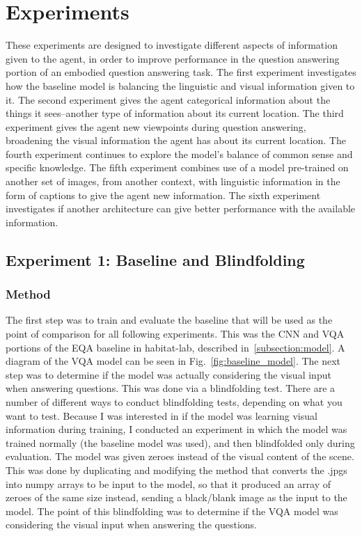 \chapter{Experiments}
These experiments are designed to investigate different aspects of information given to the agent, in order to improve performance in the question answering portion of an embodied question answering task. The first experiment investigates how the baseline model is balancing the linguistic and visual information given to it. The second experiment gives the agent categorical information about the things it sees--another type of information about its current location. The third experiment gives the agent new viewpoints during question answering, broadening the visual information the agent has about its current location. The fourth experiment continues to explore the model's balance of common sense and specific knowledge. The fifth experiment combines use of a model pre-trained on another set of images, from another context, with linguistic information in the form of captions to give the agent new information. The sixth experiment investigates if another architecture can give better performance with the available information. 

\section{Experiment 1: Baseline and Blindfolding}
\label{sec:exp_1}
\subsection{Method}
The first step was to train and evaluate the baseline that will be used as the point of comparison for all following experiments. This was the CNN and VQA portions of the EQA baseline in habitat-lab, described in~\ref{subsection:model}. A diagram of the VQA model can be seen in Fig.~\ref{fig:baseline_model}. \newline
The next step was to determine if the model was actually considering the visual input when answering questions. This was done via a blindfolding test. There are a number of different ways to conduct blindfolding tests, depending on what you want to test. Because I was interested in if the model was learning visual information during training, I conducted an experiment in which the model was trained normally (the baseline model was used), and then blindfolded only during evaluation. The model was given zeroes instead of the visual content of the scene. This was done by duplicating and modifying the method that converts the .jpgs into numpy arrays to be input to the model, so that it produced an array of zeroes of the same size instead, sending a black/blank image as the input to the model. The point of this blindfolding was to determine if the VQA model was considering the visual input when answering the questions. 

